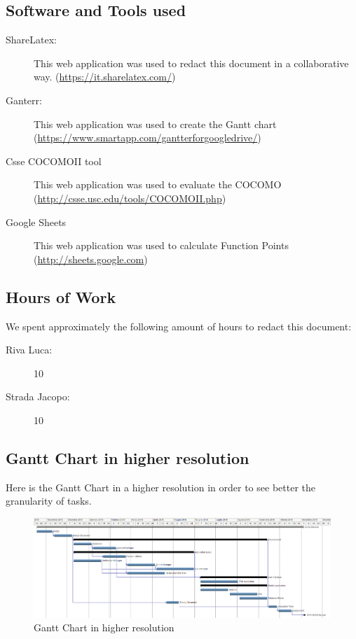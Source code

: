 \documentclass[a4paper]{article}
\begin{document}
\subsection{Software and Tools used}

\begin{description}
\item[ShareLatex:] This web application was used to redact this document in a collaborative way. 
\newline (\url{https://it.sharelatex.com/})
\item[Ganterr:] This web application was used to create the Gantt chart
\newline (\url{https://www.smartapp.com/gantterforgoogledrive/})
\item[Csse COCOMOII tool] This web application was used to evaluate the COCOMO
\newline(\url{http://csse.usc.edu/tools/COCOMOII.php})
\item[Google Sheets] This web application was used to calculate Function Points
\newline(\url{http://sheets.google.com})
\end{description}

\subsection{Hours of Work}
We spent approximately the following amount of hours to redact this document:
\begin{description}
\item[Riva Luca:] 10
\item[Strada Jacopo:] 10 
\end{description}

\subsection{Gantt Chart in higher resolution}
\nopagebreak
Here is the Gantt Chart in a higher resolution in order to see better the granularity of tasks.
\nopagebreak
\begin{figure}[H]
\includegraphics[width=.88\textheight, angle =90]{GANTT_CHART_BIG}
\centering
\caption{Gantt Chart in higher resolution}
\label{fig:GANTT_CHART_BIG}
\end{figure}
\end{document}
